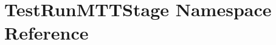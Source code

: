 \hypertarget{namespaceTestRunMTTStage}{\section{Test\-Run\-M\-T\-T\-Stage Namespace Reference}
\label{namespaceTestRunMTTStage}
}
